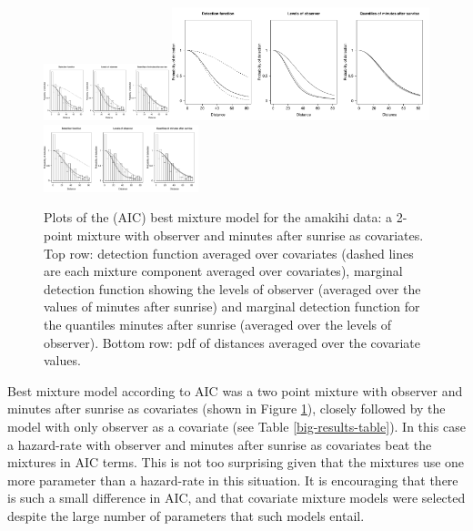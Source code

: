 \documentclass[useAMS,referee]{biom}
\begin{document}
\begin{figure}
\centering
\includegraphics[width=0.3333\textwidth, trim=0 0 7.133334in 0, clip=true]{analyses/amakihi-om.pdf}\includegraphics[width=0.6666\textwidth, trim=3.566667in 0 0 0, clip=true]{analyses/amakihi-om-hh.pdf}\\
\includegraphics[width=0.4\textwidth]{analyses/amakihi-om.pdf}
\caption{Plots of the (AIC) best mixture model for the amakihi data: a 2-point mixture with observer and minutes after sunrise as covariates. Top row: detection function averaged over covariates (dashed lines are each mixture component averaged over covariates), marginal detection function showing the levels of observer (averaged over the values of minutes after sunrise) and marginal detection function for the quantiles minutes after sunrise (averaged over the levels of observer). Bottom row: pdf of distances averaged over the covariate values.}
\label{amakihi}
\end{figure}

Best mixture model according to AIC was a two point mixture with observer and minutes after sunrise as covariates (shown in Figure \ref{amakihi}), closely followed by the model with only observer as a covariate (see Table \ref{big-results-table}). In this case a hazard-rate with observer and minutes after sunrise as covariates beat the mixtures in AIC terms. This is not too surprising given that the mixtures use one more parameter than a hazard-rate in this situation. It is encouraging that there is such a small difference in AIC, and that covariate mixture models were selected despite the large number of parameters that such models entail.
\end{document}
